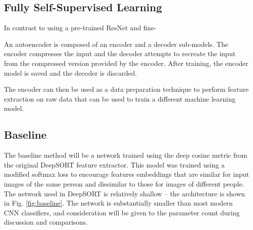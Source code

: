 \documentclass[10pt,twocolumn,letterpaper]{article}
\begin{document}
\subsection{Fully Self-Supervised Learning}
In contrast to using a pre-trained ResNet and fine-

An autoencoder is composed of an encoder and a decoder sub-models. The encoder compresses the input and the decoder attempts to recreate the input from the compressed version provided by the encoder. After training, the encoder model is saved and the decoder is discarded.

The encoder can then be used as a data preparation technique to perform feature extraction on raw data that can be used to train a different machine learning model.






\subsection{Baseline}
The baseline method will be a network trained using the deep cosine metric \cite{Wojke2018cosine} from the original DeepSORT feature extractor. This model was trained using a modified softmax loss to encourage features embeddings that are similar for input images of the same person and dissimilar to those for images of different people. The network used in DeepSORT is relatively shallow -- the architecture is shown in Fig. \ref{fig:baseline}. The network is substantially smaller than most modern CNN classifiers, and consideration will be given to the parameter count during discussion and comparisons.
\end{document}
